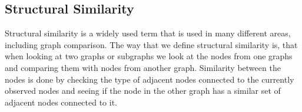 \subsection{Structural Similarity}
Structural similarity is a widely used term that is used in many different areas, including graph comparison. The way that we define structural similarity is, that when looking at two graphs or subgraphs we look at the nodes from one graphs and comparing them with nodes from another graph. Similarity between the nodes is done by checking the type of adjacent nodes connected to the currently observed nodes and seeing if the node in the other graph has a similar set of adjacent nodes connected to it.